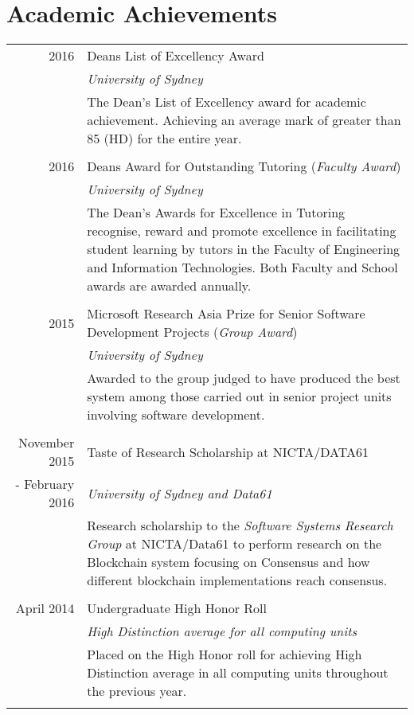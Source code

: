 \documentclass[10pt]{article}
\begin{document}
\section{Academic Achievements}
\begin{tabular}{r p{11cm}}
	2016 & Deans List of Excellency Award \\ & \emph{University of Sydney} \\ & \footnotesize{The Dean's List of Excellency award for academic achievement. Achieving an average mark of greater than 85 (HD) for the entire year.}\\\multicolumn{2}{c}{}\\

2016 & Deans Award for Outstanding Tutoring (\emph{Faculty Award}) \\ & \emph{University of Sydney} \\ & \footnotesize{The Dean's Awards for Excellence in Tutoring recognise, reward and promote excellence in facilitating student learning by tutors in the Faculty of Engineering and Information Technologies. Both Faculty and School awards are awarded annually.}\\\multicolumn{2}{c}{}\\

2015 & Microsoft Research Asia Prize for Senior Software Development Projects (\emph{Group Award}) \\  & \emph{University of Sydney}\\ & \footnotesize{Awarded to the group judged to have produced the best system among those carried out in senior project units involving software development.}\\\multicolumn{2}{c}{}\\

November 2015 &Taste of Research Scholarship at \textsc{NICTA/DATA61} \\ - February 2016 & \emph{University of Sydney and Data61}\\&\footnotesize{Research scholarship to the \emph{Software Systems Research Group} at NICTA/Data61 to perform research on the Blockchain system focusing on Consensus and how different blockchain implementations reach consensus.}\\\multicolumn{2}{c}{} \\

April 2014 & Undergraduate High Honor Roll \\ & \emph{High Distinction average for all computing units}\\&\footnotesize{Placed on the High Honor roll for achieving High Distinction average in all computing units throughout the previous year.}\\\multicolumn{2}{c}{} \\
\end{tabular}
\end{document}
